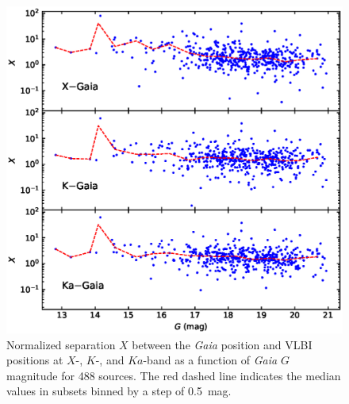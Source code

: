\documentclass{aa-note}   %
\begin{document}
\begin{figure}[hbtp]
    \centering
    \includegraphics[width=\columnwidth]{figs/X-g-mag}
    \caption[]{\label{fig:$X$-g-mag}
        Normalized separation $X$ between the {\it Gaia} position and VLBI positions at $X$-, $K$-, and $Ka$-band as a function of \textit{Gaia} $G$ magnitude for 488 sources.
        The red dashed line indicates the median values in subsets binned by a step of 0.5~mag.
    }
\end{figure}
\end{document}
